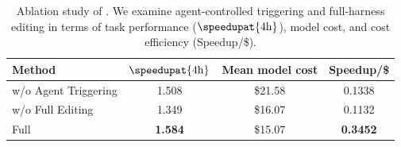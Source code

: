 \begin{table}[t]
  \centering
  \small
  \setlength{\tabcolsep}{6pt}

  \caption{Ablation study of \boxbox{}.
  We examine agent-controlled triggering and full-harness editing
  in terms of task performance (\(\speedupat{4\mathrm{h}}\)), model cost,
  and cost efficiency (Speedup/\$).}
  \label{tab:boxbox-online-ablation}
  \begin{tabular}{lccc}
    \toprule
    Method & \(\speedupat{4\mathrm{h}}\) & Mean model cost & Speedup/\$ \\
    \midrule
    w/o Agent Triggering & 1.508 & \$21.58 & 0.1338 \\
    w/o Full Editing & 1.349 & \$16.07 & 0.1132 \\
    Full \boxbox{} & \textbf{1.584} & \$15.07 & \textbf{0.3452} \\
    \bottomrule
  \end{tabular}
\end{table}
